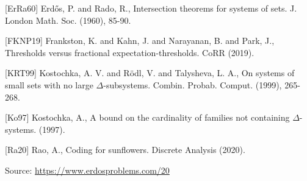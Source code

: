 \documentclass{article}
\begin{document}
 [ErRa60] Erd\H{o}s, P. and Rado, R., Intersection theorems for systems of sets. J. London Math. Soc. (1960), 85-90.
 
 [FKNP19] Frankston, K. and Kahn, J. and Narayanan, B. and Park, J., Thresholds versus fractional expectation-thresholds. CoRR (2019).
 
 [KRT99] Kostochka, A. V. and R\"{o}dl, V. and Talysheva, L. A., On systems of small sets with no large $\Delta$-subsystems. Combin. Probab. Comput. (1999), 265-268.
 
 [Ko97] Kostochka, A., A bound on the cardinality of families not containing $\Delta$-systems. (1997).
 
 [Ra20] Rao, A., Coding for sunflowers. Discrete Analysis (2020).

\bigskip
\noindent\small{Source: \url{https://www.erdosproblems.com/20}}
\end{document}
